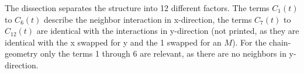 The dissection separates the structure into 12 different factors. The terms $C_1(t)$ to $C_6(t)$ describe the neighbor interaction in x-direction, the terms $C_7(t)$ to $C_{12}(t)$ are identical with the interactions in y-direction (not printed, as they are identical with the x swapped for y and the 1 swapped for an $M$).
For the chain-geometry only the terms 1 through 6 are relevant, as there are no neighbors in y-direction.

\cite{TDVPcomplexPrefactors} %
\cite{complexDifferentiation} %
\cite{probabilitySamplingRequirementVCN} %
\cite{variationalClassicalNetworksPaper} %

